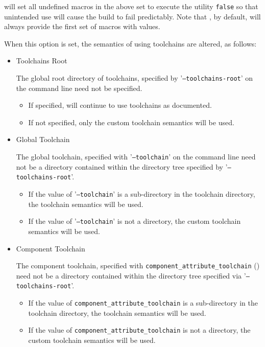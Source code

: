 \lmsbw will set all undefined macros in the above set to execute the
utility \texttt{false} so that unintended use will cause the build to
fail predictably.  Note that \gnumake, by default, will always provide
the first set of macros with values.

When this option is set, the semantics of using toolchains are
altered, as follows:

\begin{itemize}

\item{Toolchains Root}

  The global root directory of \ctng toolchains, specified by
  '\texttt{--toolchains-root}' on the \lmsbw command line need not be
  specified.

  \begin{itemize}

    \item If specified, \lmsbw will continue to use \ctng toolchains
      as documented.

    \item If not specified, only the custom toolchain semantics will
      be used.

  \end{itemize}

  \item{Global Toolchain}

  The global toolchain, specified with '\texttt{--toolchain}' on the
  \lmsbw command line need not be a directory contained within the
  directory tree specified by '\texttt{--toolchains-root}'.

  \begin{itemize}
    \item If the value of '\texttt{--toolchain}' is a sub-directory in
      the \ctng toolchain directory, the \ctng toolchain semantics
      will be used.

    \item If the value of '\texttt{--toolchain}' is not a directory, the
      custom toolchain semantics will be used.
  \end{itemize}

  \item{Component Toolchain}

    The component toolchain, specified with
    \texttt{component\_attribute\_toolchain} ()
    need not be a directory contained within the directory tree
    specified via '\texttt{--toolchains-root}'.

  \begin{itemize}
    \item If the value of \texttt{component\_attribute\_toolchain} is
      a sub-directory in the \ctng toolchain directory, the \ctng
      toolchain semantics will be used.

    \item If the value of \texttt{component\_attribute\_toolchain} is
      not a directory, the custom toolchain semantics will be used.
  \end{itemize}
\end{itemize}

